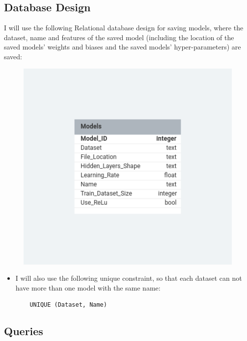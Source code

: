 \documentclass[./project-report/src/latex/project-report.tex]{subfiles}
\begin{document}
\pagebreak

\subsection{Database Design}

I will use the following Relational database design for saving models, where the dataset, name and features of the saved model (including the location of the 
saved models' weights and biases and the saved models' hyper-parameters) are saved:

\begin{figure}[h!]
\centering
\includegraphics[width=1\textwidth]{./project-report/src/images/database-design.png}
\end{figure}

\begin{itemize}
    \item I will also use the following unique constraint, so that each dataset can not have more than one model with the same name:
    \begin{verbatim}
    UNIQUE (Dataset, Name)
    \end{verbatim}
\end{itemize}

\subsection{Queries}
\end{document}
